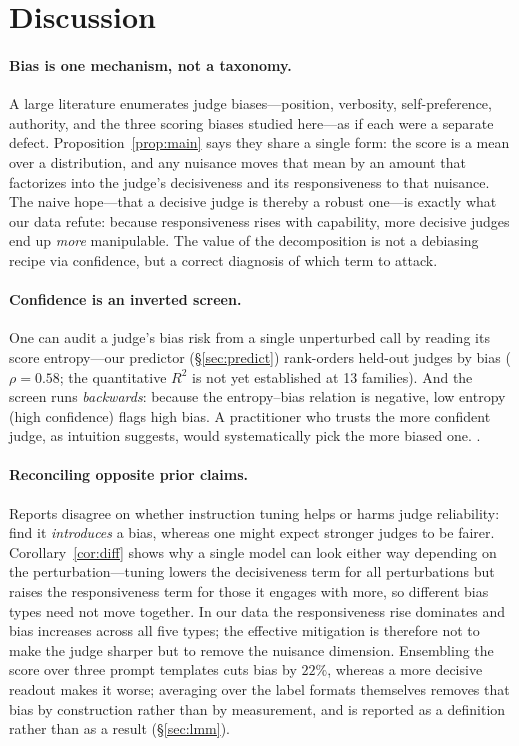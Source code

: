 \documentclass[11pt]{article}
\begin{document}
\section{Discussion}
\paragraph{Bias is one mechanism, not a taxonomy.} A large literature enumerates judge
biases---position, verbosity, self-preference, authority, and the three scoring biases
studied here---as if each were a separate defect. Proposition~\ref{prop:main} says they
share a single form: the score is a mean over a distribution, and any nuisance moves that
mean by an amount that factorizes into the judge's decisiveness and its responsiveness to
that nuisance. The naive hope---that a decisive judge is thereby a robust one---is exactly
what our data refute: because responsiveness rises with capability, more decisive judges
end up \emph{more} manipulable. The value of the decomposition is not a debiasing recipe
via confidence, but a correct diagnosis of which term to attack.

\paragraph{Confidence is an inverted screen.} One can audit a judge's bias risk from a
single unperturbed call by reading its score entropy---our predictor
(\S\ref{sec:predict}) rank-orders held-out judges by bias ($\rho=0.58$; the quantitative
$R^2$ is not yet established at 13 families). And the screen runs \emph{backwards}:
because the entropy--bias relation is negative, low entropy (high confidence) flags
high bias. A
practitioner who trusts the more confident judge, as intuition suggests, would
systematically pick the more biased one. \GOLDSENTENCE{}. \DISCUSSION{}

\paragraph{Reconciling opposite prior claims.} Reports disagree on whether instruction
tuning helps or harms judge reliability: \citet{pan2025user} find it \emph{introduces} a
bias, whereas one might expect stronger judges to be fairer. Corollary~\ref{cor:diff}
shows why a single model can look either way depending on the perturbation---tuning lowers
the decisiveness term for all perturbations but raises the responsiveness term for those
it engages with more, so different bias types need not move together. In our data the
responsiveness rise dominates and bias increases across all five types; the effective
mitigation is therefore not to make the judge sharper but to remove the nuisance
dimension. Ensembling the score over three prompt templates cuts bias by $22\%$,
whereas a more decisive readout makes it worse; averaging over the label formats
themselves removes that bias by construction rather than by measurement, and is
reported as a definition rather than as a result (\S\ref{sec:lmm}).
\end{document}
